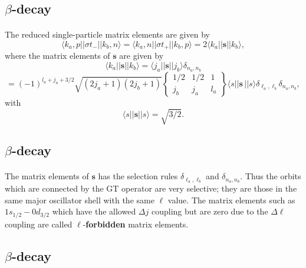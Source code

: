 \documentclass[%
oneside,                 %
final,                   %
10pt]{article}
\begin{document}
\subsection{$\beta$-decay}

\paragraph{}
The reduced single-particle
matrix elements are given by
\[
\langle k_{a},p\vert\vert \sigma  t_{-}\vert\vert k_{b},n\rangle=\langle k_{a},n\vert\vert \sigma  t_{+}\vert\vert k_{b},p\rangle= 2\langle k_{a}\vert\vert \mathbf{s}\vert\vert k_{b}\rangle, 
\]
where the matrix elements of $\mathbf{s}$ are given by
\[
\langle k_{a}\vert\vert \mathbf{s}\vert\vert k_{b}\rangle=\langle j_{a}\vert\vert \mathbf{s}\vert\vert j_{b}\rangle \delta_{n_{a},n_{b}}
\]
\[
=(-1)^{l_{a}+j_{a}+3/2}
\sqrt{(2j_{a}+1)(2j_{b}+1)}\left\{\begin{array}{ccc}  {1/2}&  {1/2}&  {1} \\ {j_{b}}&  {j_{a}}&  {l_{a}}\end{array}\right\}
\langle s\vert\vert \mathbf{s}\,\vert\vert s\rangle \delta _{\ell _{a},\ell _{b}} \delta_{n_{a},n_{b}}
,
\]
with
\[
\langle s\vert\vert \mathbf{s}\vert\vert s\rangle= \sqrt{3/2}.
\]



\subsection{$\beta$-decay}

\paragraph{}
The matrix elements of $\mathbf{s}$ has the selection rules $\delta_{ \ell_{a} , \ell_{b} }$
and $\delta_{n _{a} ,n _{b} }$. Thus the orbits which are connected by the GT operator
are very selective; they are those in the same major oscillator shell
with the same $\ell$ value. The matrix elements such as
$1s_{1/2}-0d_{3/2}$ which have the allowed $\Delta j$ coupling but
are zero due to the $\Delta\ell$ coupling are called $\ell$-\textbf{forbidden} matrix
elements.



\subsection{$\beta$-decay}
\end{document}
